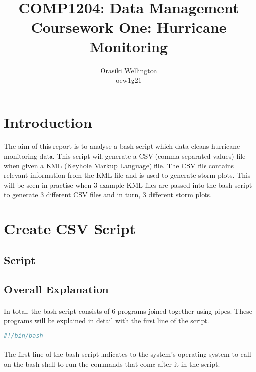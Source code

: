 \documentclass[]{article}
\title{COMP1204: Data Management \\ Coursework One: Hurricane Monitoring }
\author{Orasiki Wellington \\ oew1g21}
\begin{document}
\maketitle

\section{Introduction}
\paragraph{}The aim of this report is to analyse a bash script which data cleans hurricane monitoring data. This script will generate a CSV (comma-separated values) file when given a KML (Keyhole Markup Language) file.  The CSV file contains relevant information from the KML file and is used to generate storm plots. This will be seen in practise when 3 example KML files are passed into the bash script to generate 3 different CSV files and in turn, 3 different storm plots.



\section{Create CSV Script}

\subsection{Script}



\subsection{Overall Explanation}

\paragraph{}In total, the bash script consists of 6 programs joined together using pipes. These programs will be explained in detail with the first line of the script.

\begin{lstlisting}[language=Bash, caption = First line of Bash script]
#!/bin/bash
\end{lstlisting}
\paragraph{}The first line of the bash script indicates to the system's operating system to call on the bash shell to run the commands that come after it in the script.
\end{document}
